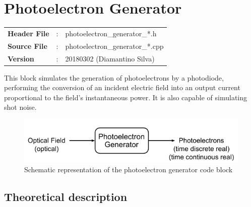 \clearpage

\section{Photoelectron Generator}

\begin{tcolorbox}	
\begin{tabular}{p{2.75cm} p{0.2cm} p{10.5cm}} 	
\textbf{Header File}   &:& photoelectron\_generator\_*.h \\
\textbf{Source File}   &:& photoelectron\_generator\_*.cpp \\
\textbf{Version}       &:& 20180302 (Diamantino Silva)
\end{tabular}
\end{tcolorbox}

\vspace{1em}

This block simulates the generation of photoelectrons by a photodiode, performing the conversion of an incident electric field into an output current proportional to the field's instantaneous power.
It is also capable of simulating shot noise.
%
\begin{figure}[h]
	\centering
	\includegraphics{./lib/photoelectron_generator/figures/photoelectron_generator_scheme.pdf}
	\caption{Schematic representation of the photoelectron generator code block}
\end{figure}

\subsection*{Theoretical description}

